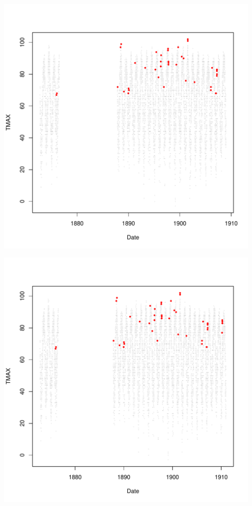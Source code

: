 \documentclass{article}\usepackage[]{graphicx}\usepackage[]{color}
\makeatletter
\def\maxwidth{ %
  \ifdim\Gin@nat@width>\linewidth
    \linewidth
  \else
    \Gin@nat@width
  \fi
}
\newenvironment{knitrout}{}{} %
\makeatother
\begin{document}
\begin{knitrout}
\includegraphics[width=\maxwidth]{figure/unnamed-chunk-4-14} 

\includegraphics[width=\maxwidth]{figure/unnamed-chunk-4-15} 


\end{knitrout}
\end{document}
